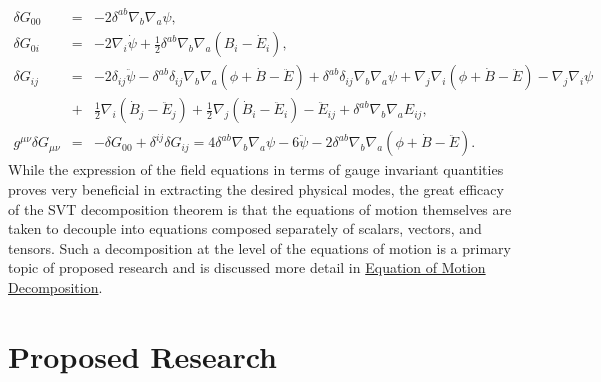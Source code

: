 \documentclass[10pt,letterpaper]{article}
\numberwithin{equation}{section}
\begin{document}
\begin{eqnarray}
\delta G_{00}&=&- 2 \delta^{ab} {\nabla}_{b}{\nabla}_{a}\psi,
\nonumber\\
\delta G_{0i}&=&- 2 {\nabla}_{i}\dot{\psi}+ \tfrac{1}{2} \delta^{ab} {\nabla}_{b}{\nabla}_{a}(B_{i} -  \dot{E}_{i}),
\nonumber\\
\delta G_{ij}&=&- 2 \delta_{ij} \ddot{\psi} -  \delta^{ab} \delta_{ij} {\nabla}_{b}{\nabla}_{a}(\phi+\dot{B}  -\ddot{E})+ \delta^{ab} \delta_{ij} {\nabla}_{b}{\nabla}_{a}\psi 
+ {\nabla}_{j}{\nabla}_{i}(\phi+\dot{B} -  \ddot{E})  -  {\nabla}_{j}{\nabla}_{i}\psi
\nonumber\\
&+& \tfrac{1}{2} {\nabla}_{i}(\dot{B}_{j} - \ddot{E}_{j}) + \tfrac{1}{2} {\nabla}_{j}(\dot{B}_{i}  
- \ddot{E}_{i})- \ddot{E}_{ij} + \delta^{ab} {\nabla}_{b}{\nabla}_{a}E_{ij},
\nonumber\\
g^{\mu\nu}\delta G_{\mu\nu}&=&-\delta G_{00}+\delta^{ij}\delta G_{ij}=4 \delta^{ab} {\nabla}_{b}{\nabla}_{a}\psi -6\ddot{\psi}-2 \delta^{ab} {\nabla}_{b}{\nabla}_{a}(\phi+\dot{B}  -\ddot{E}).
\label{deinSVTflat}
\end{eqnarray}
While the expression of the field equations in terms of gauge invariant quantities proves very beneficial in extracting the desired physical modes, the great efficacy of the SVT decomposition theorem is that the equations of motion themselves are taken to decouple into equations composed separately of scalars, vectors, and tensors. Such a decomposition at the level of the equations of motion is a primary topic of proposed research and is discussed more detail in \hyperref[sec:Equation of Motion Decomposition]{Equation of Motion Decomposition}. 
%
\section{Proposed Research}
\label{sec:Proposed Research}
%
\end{document}
